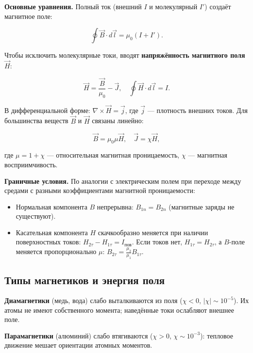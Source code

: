 \documentclass[12pt]{article}
\begin{document}
\vspace{0.5cm}

\noindent\textbf{Основные уравнения.} Полный ток (внешний $I$ и молекулярный $I'$) создаёт магнитное поле:

\[
    \oint \vec{B} \cdot d\vec{l} = \mu_0(I + I').
\]

Чтобы исключить молекулярные токи, вводят \textbf{напряжённость магнитного поля} $\vec{H}$:

\[
    \vec{H} = \frac{\vec{B}}{\mu_0} - \vec{J}, \quad \oint \vec{H} \cdot d\vec{l} = I.
\]

В дифференциальной форме: $\nabla \times \vec{H} = \vec{j}$, где $\vec{j}$ — плотность внешних токов. 
Для большинства веществ $\vec{B}$ и $\vec{H}$ связаны линейно:

\[
    \vec{B} = \mu_0\mu\vec{H}, \quad \vec{J} = \chi\vec{H},
\]

где $\mu = 1 + \chi$ — относительная магнитная проницаемость, $\chi$ — магнитная восприимчивость. 

\vspace{0.5cm}

\noindent\textbf{Граничные условия.} По аналогии с электрическим полем при переходе между средами с 
разными коэффициентами магнитной проницаемости:

\begin{itemize}
    \item Нормальная компонента $B$ непрерывна: $B_{1n} = B_{2n}$ (магнитные заряды не существуют).
    \item Касательная компонента $H$ скачкообразно меняется при наличии поверхностных токов: $H_{2\tau} - H_{1\tau} = I_{\text{пов}}$. 
    Если токов нет, $H_{1\tau} = H_{2\tau}$, 
    а $B$-поле меняется пропорционально $\mu$: $B_{2\tau} = \frac{\mu_2}{\mu_1} B_{1\tau}$.
\end{itemize}

\subsection{Типы магнетиков и энергия поля}

\noindent\textbf{Диамагнетики} (медь, вода) слабо выталкиваются из поля ($\chi < 0$, $|\chi| \sim 10^{-5}$). 
Их атомы не имеют собственного момента; наведённые токи ослабляют внешнее поле. 

\textbf{Парамагнетики} (алюминий) слабо втягиваются ($\chi > 0$, $\chi \sim 10^{-3}$): 
тепловое движение мешает ориентации атомных моментов. 
\end{document}
